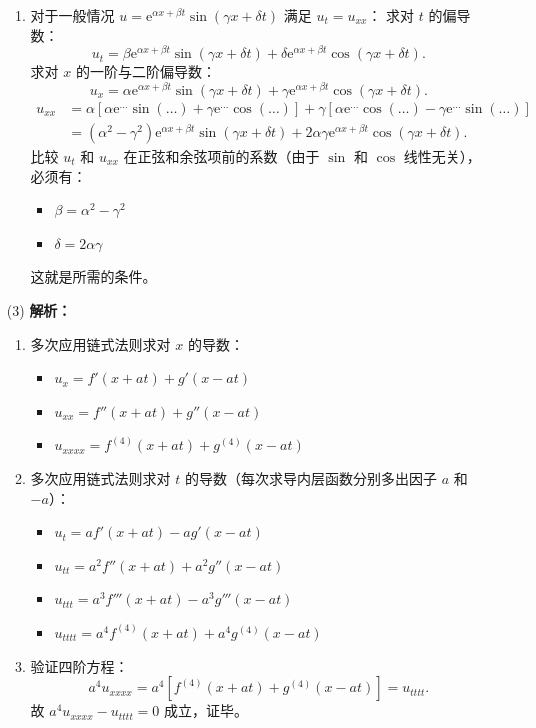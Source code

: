 \documentclass[lang=cn,11pt]{elegantbook}
\begin{document}
\begin{solution}
\begin{enumerate}
\begin{enumerate}
      \item 对于一般情况 $u=\mathrm{e}^{\alpha x+\beta t}\sin(\gamma x+\delta t)$ 满足 $u_t=u_{xx}$：
      求对 $t$ 的偏导数：
      \[
      u_t = \beta \mathrm{e}^{\alpha x+\beta t}\sin(\gamma x+\delta t) + \delta \mathrm{e}^{\alpha x+\beta t}\cos(\gamma x+\delta t).
      \]
      求对 $x$ 的一阶与二阶偏导数：
      \[
      u_x = \alpha \mathrm{e}^{\alpha x+\beta t}\sin(\gamma x+\delta t) + \gamma \mathrm{e}^{\alpha x+\beta t}\cos(\gamma x+\delta t).
      \]
      \begin{align*}
      u_{xx} &= \alpha \left[ \alpha \mathrm{e}^{\dots}\sin(\dots) + \gamma \mathrm{e}^{\dots}\cos(\dots) \right] + \gamma \left[ \alpha \mathrm{e}^{\dots}\cos(\dots) - \gamma \mathrm{e}^{\dots}\sin(\dots) \right] \\[6pt]
      &= (\alpha^2-\gamma^2)\mathrm{e}^{\alpha x+\beta t}\sin(\gamma x+\delta t) + 2\alpha\gamma \mathrm{e}^{\alpha x+\beta t}\cos(\gamma x+\delta t).
      \end{align*}
      比较 $u_t$ 和 $u_{xx}$ 在正弦和余弦项前的系数（由于 $\sin$ 和 $\cos$ 线性无关），必须有：
      \begin{itemize}
          \item $\beta = \alpha^2 - \gamma^2$
          \item $\delta = 2\alpha\gamma$
      \end{itemize}
      这就是所需的条件。
  \end{enumerate}

  \item[(3)] \textbf{解析：}
  \begin{enumerate}
      \item 多次应用链式法则求对 $x$ 的导数：
      \begin{itemize}
          \item $u_x = f'(x+at) + g'(x-at)$
          \item $u_{xx} = f''(x+at) + g''(x-at)$
          \item $u_{xxxx} = f^{(4)}(x+at) + g^{(4)}(x-at)$
      \end{itemize}
      \item 多次应用链式法则求对 $t$ 的导数（每次求导内层函数分别多出因子 $a$ 和 $-a$）：
      \begin{itemize}
          \item $u_t = a f'(x+at) - a g'(x-at)$
          \item $u_{tt} = a^2 f''(x+at) + a^2 g''(x-at)$
          \item $u_{ttt} = a^3 f'''(x+at) - a^3 g'''(x-at)$
          \item $u_{tttt} = a^4 f^{(4)}(x+at) + a^4 g^{(4)}(x-at)$
      \end{itemize}
      \item 验证四阶方程：
      \[
      a^4 u_{xxxx} = a^4 \left[ f^{(4)}(x+at) + g^{(4)}(x-at) \right] = u_{tttt}.
      \]
      故 $a^4u_{xxxx}-u_{tttt}=0$ 成立，证毕。
  \end{enumerate}
\end{enumerate}
\end{solution}
\end{document}
